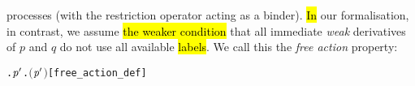 processes (with the restriction operator acting as a binder).
\hl{In} our formalisation, in contrast, 
we 
assume \hl{the weaker condition} that all immediate \emph{weak} derivatives of
 $p$ and $q$ do not use all available \hl{labels}. We  call this
 the \emph{free action} property:
\begin{alltt}
     \HOLTokenDefEquality{} \HOLSymConst{\HOLTokenExists{}}. \HOLSymConst{\HOLTokenForall{}}\ensuremath{\HOLBoundVar{p}\sp{\prime}}. \HOLSymConst{\HOLTokenNeg{}}\ensuremath{(} \HOLTokenWeakTransBegin{} \HOLTokenWeakTransEnd \ensuremath{\HOLBoundVar{p}\sp{\prime}}\ensuremath{)}\hfill{[free_action_def]}
\end{alltt}


